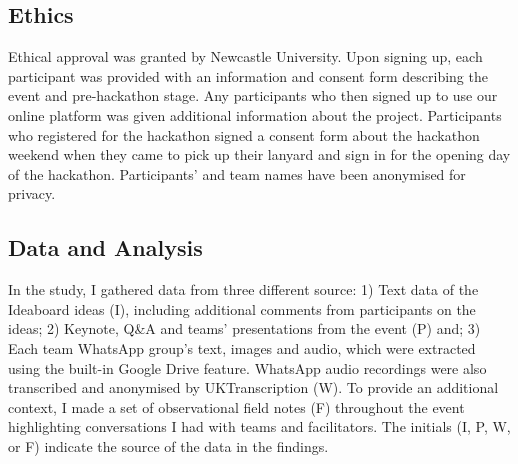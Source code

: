 \subsection{Ethics}
\label{sec:Ethics}
Ethical approval was granted by Newcastle University. Upon signing up, each participant was provided with an information and consent form describing the event and pre-hackathon stage. Any participants who then signed up to use our online platform was given additional information about the project. Participants who registered for the hackathon signed a consent form about the hackathon weekend when they came to pick up their lanyard and sign in for the opening day of the hackathon. Participants’ and team names have been anonymised for privacy.

\subsection{Data and Analysis}
\label{sec:DataAnalysis}
In the study, I gathered data from three different source: 1) Text data of the Ideaboard ideas (I), including additional comments from participants on the ideas; 2) Keynote, Q\&A and teams’ presentations from the event (P) and; 3) Each team WhatsApp group’s text, images and audio, which were extracted using the built-in Google Drive feature. WhatsApp audio recordings were also transcribed and anonymised by UKTranscription (W). To provide an additional context, I made a set of observational field notes (F) throughout the event highlighting conversations I had with teams and facilitators. The initials (I, P, W, or F) indicate the source of the data in the findings.

